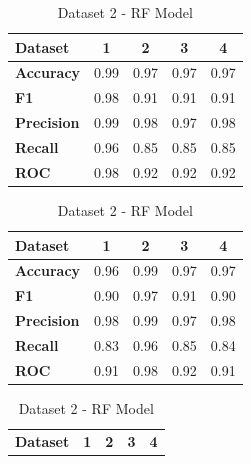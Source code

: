 \begin{table}[H]
    \centering
    \caption{RF model cross-performance results}\label{tab:rf_model_cross-performance_results}
        \begin{subtable}[H]{0.45\textwidth}
            \centering
            \begin{tabular}{|l|c|c|c|c|}
            \hline
            \textbf{Dataset} & \textbf{1} & \textbf{2} & \textbf{3} & \textbf{4} \\
            \hline
            \textbf{Accuracy} & 0.99 & 0.97 & 0.97 & 0.97 \\
            \textbf{F1} & 0.98 & 0.91 & 0.91 & 0.91 \\
            \textbf{Precision} & 0.99 & 0.98 & 0.97 & 0.98 \\
            \textbf{Recall} & 0.96 & 0.85 & 0.85 & 0.85 \\
            \textbf{ROC} & 0.98 & 0.92 & 0.92 & 0.92 \\
            \hline
            \end{tabular}
            \caption{Dataset 1 - RF Model}\label{subtab:dataset_1_rf_model}
        \end{subtable}
    \quad
    \begin{subtable}[H]{0.45\textwidth}
        \centering
        \begin{tabular}{|l|c|c|c|c|}
            \hline
            \textbf{Dataset} & \textbf{1} & \textbf{2} & \textbf{3} & \textbf{4} \\
            \hline
            \textbf{Accuracy} & 0.96 & 0.99 & 0.97 & 0.97 \\
            \textbf{F1} & 0.90 & 0.97 & 0.91 & 0.90 \\
            \textbf{Precision} & 0.98 & 0.99 & 0.97 & 0.98 \\
            \textbf{Recall} & 0.83 & 0.96 & 0.85 & 0.84 \\
            \textbf{ROC} & 0.91 & 0.98 & 0.92 & 0.91 \\
            \hline
        \end{tabular}
        \caption{Dataset 2 - RF Model}\label{subtab:dataset_2_rf_model}
    \end{subtable}
    \quad
    \begin{subtable}[H]{0.45\textwidth}
        \centering
        \begin{tabular}{|l|c|c|c|c|}
            \hline
            \textbf{Dataset} & \textbf{1} & \textbf{2} & \textbf{3} & \textbf{4} \\

\end{tabular}
\end{subtable}
\end{table}
